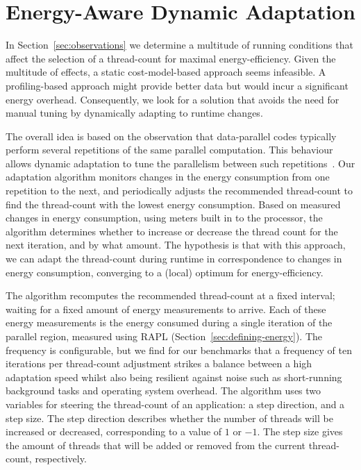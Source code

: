 \section{Energy-Aware Dynamic Adaptation}\label{sec:implementation}
In Section~\ref{sec:observations} we determine a multitude of running conditions that affect the
selection of a thread-count for maximal energy-efficiency. Given the multitude of effects, a static
cost-model-based approach seems infeasible. A profiling-based approach might provide better data but
would incur a significant energy overhead. Consequently, we look for a solution that avoids the need
for manual tuning by dynamically adapting to runtime changes.

The overall idea is based on the observation that data-parallel codes typically perform several
repetitions of the same parallel computation. This behaviour allows dynamic adaptation to tune the
parallelism between such repetitions~\cite{sac-mtdynamic}. Our adaptation algorithm monitors changes
in the energy consumption from one repetition to the next, and periodically adjusts the recommended
thread-count to find the thread-count with the lowest energy consumption. Based on measured changes
in energy consumption, using meters built in to the processor, the algorithm determines whether to
increase or decrease the thread count for the next iteration, and by what amount. The hypothesis is
that with this approach, we can adapt the thread-count during runtime in correspondence to changes
in energy consumption, converging to a (local) optimum for energy-efficiency.

The algorithm recomputes the recommended thread-count at a fixed interval; waiting for a fixed
amount of energy measurements to arrive. Each of these energy measurements is the energy consumed
during a single iteration of the parallel region, measured using RAPL
(Section~\ref{sec:defining-energy}). The frequency is configurable, but we find for our benchmarks
that a frequency of ten iterations per thread-count adjustment strikes a balance between a high
adaptation speed whilst also being resilient against noise such as short-running background tasks
and operating system overhead. The algorithm uses two variables for steering the thread-count of an
application: a step direction, and a step size. The step direction describes whether the number of
threads will be increased or decreased, corresponding to a value of $1$ or $-1$. The step size gives
the amount of threads that will be added or removed from the current thread-count, respectively.

